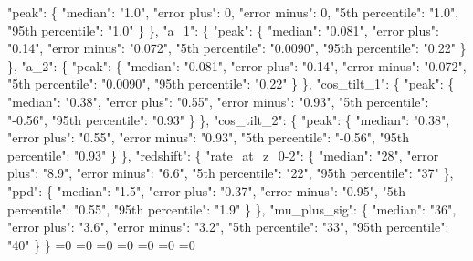 {{        "peak": \{%
          "median": "1.0", %
          "error plus": 0, %
          "error minus": 0, %
          "5th percentile": "1.0", %
          "95th percentile": "1.0"%
        \}%
      \}, %
      "a\_1": \{%
        "peak": \{%
          "median": "0.081", %
          "error plus": "0.14", %
          "error minus": "0.072", %
          "5th percentile": "0.0090", %
          "95th percentile": "0.22"%
        \}%
      \}, %
      "a\_2": \{%
        "peak": \{%
          "median": "0.081", %
          "error plus": "0.14", %
          "error minus": "0.072", %
          "5th percentile": "0.0090", %
          "95th percentile": "0.22"%
        \}%
      \}, %
      "cos\_tilt\_1": \{%
        "peak": \{%
          "median": "0.38", %
          "error plus": "0.55", %
          "error minus": "0.93", %
          "5th percentile": "{-}0.56", %
          "95th percentile": "0.93"%
        \}%
      \}, %
      "cos\_tilt\_2": \{%
        "peak": \{%
          "median": "0.38", %
          "error plus": "0.55", %
          "error minus": "0.93", %
          "5th percentile": "{-}0.56", %
          "95th percentile": "0.93"%
        \}%
      \}, %
      "redshift": \{%
        "rate\_at\_z\_0{-}2": \{%
          "median": "28", %
          "error plus": "8.9", %
          "error minus": "6.6", %
          "5th percentile": "22", %
          "95th percentile": "37"%
        \}, %
        "ppd": \{%
          "median": "1.5", %
          "error plus": "0.37", %
          "error minus": "0.95", %
          "5th percentile": "0.55", %
          "95th percentile": "1.9"%
        \}%
      \}, %
      "mu\_plus\_sig": \{%
        "median": "36", %
        "error plus": "3.6", %
        "error minus": "3.2", %
        "5th percentile": "33", %
        "95th percentile": "40"%
      \}%
    \}}%
  \else%
    \ifnum{}=0%
      \let\DefaultBBHSubdominantMode@out\DefaultBBHSubdominantMode@I%
    \else%
      \ifnum{}=0%
      \let\DefaultBBHSubdominantMode@out\DefaultBBHSubdominantMode@II%
    \else%
      \ifnum{}=0%
      \let\DefaultBBHSubdominantMode@out\DefaultBBHSubdominantMode@III%
    \else%
      \ifnum{}=0%
      \let\DefaultBBHSubdominantMode@out\DefaultBBHSubdominantMode@IV%
    \else%
      \ifnum{}=0%
      \let\DefaultBBHSubdominantMode@out\DefaultBBHSubdominantMode@V%
    \else%
      \ifnum{}=0%
      \let\DefaultBBHSubdominantMode@out\DefaultBBHSubdominantMode@VI%
    \else%
      \ifnum{}=0%
      \let\DefaultBBHSubdominantMode@out\DefaultBBHSubdominantMode@VII%
}
